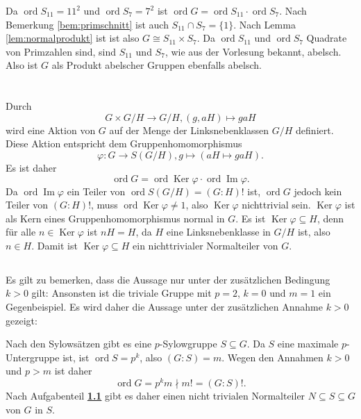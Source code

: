 \documentclass[a4paper,10pt]{article}
\theoremstyle{definition}
\newcommand{\ord}{\operatorname{ord}}
\newcommand{\Img}{\operatorname{Im}}
\newcommand{\Ker}{\operatorname{Ker}}
\begin{document}
Da $\ord S_{11} = 11^2$ und $\ord S_7 = 7^2$ ist $\ord G = \ord S_{11} \cdot \ord S_7$. Nach Bemerkung \ref{bem:primschnitt} ist auch $S_{11} \cap S_7 = \{1\}$. Nach Lemma \ref{lem:normalprodukt} ist ist also $G \cong S_{11} \times S_7$. Da $\ord S_{11}$ und $\ord S_7$ Quadrate von Primzahlen sind, sind $S_{11}$ und $S_7$, wie aus der Vorlesung bekannt, abelsch. Also ist $G$ als Produkt abelscher Gruppen ebenfalls abelsch.











\section{}


\subsection{}\label{ssec:fak}
Durch
\[
 G \times G/H \rightarrow G/H, (g,aH) \mapsto gaH
\]
wird eine Aktion von $G$ auf der Menge der Linksnebenklassen $G/H$ definiert. Diese Aktion entspricht dem Gruppenhomomorphismus
\[
 \varphi : G \rightarrow S(G/H), g \mapsto (aH \mapsto gaH).
\]
Es ist daher
\[
 \ord G
 = \ord \Ker \varphi \cdot \ord \Img \varphi.
\]
Da $\ord \Img \varphi$ ein Teiler von $\ord S(G/H) = (G:H)!$ ist, $\ord G$ jedoch kein Teiler von $(G : H)!$, muss $\ord \Ker \varphi \neq 1$, also $\Ker \varphi$ nichttrivial sein. $\Ker \varphi$ ist als Kern eines Gruppenhomomorphismus normal in $G$. Es ist $\Ker \varphi \subseteq H$, denn für alle $n \in \Ker \varphi$ ist $nH = H$, da $H$ eine Linksnebenklasse in $G/H$ ist, also $n \in H$. Damit ist $\Ker \varphi \subseteq H$ ein nichttrivialer Normalteiler von $G$.


\subsection{}
Es gilt zu bemerken, dass die Aussage nur unter der zusätzlichen Bedingung $k > 0$ gilt: Ansonsten ist die triviale Gruppe mit $p=2$, $k=0$ und $m=1$ ein Gegenbeispiel. Es wird daher die Aussage unter der zusätzlichen Annahme $k > 0$ gezeigt:

Nach den Sylowsätzen gibt es eine $p$-Sylowgruppe $S \subseteq G$. Da $S$ eine maximale $p$-Untergruppe ist, ist $\ord S = p^k$, also $(G : S) = m$. Wegen den Annahmen $k > 0$ und $p > m$ ist daher
\[
\ord G = p^k m \nmid m! = (G : S)!.
\]
Nach Aufgabenteil \textbf{\ref{ssec:fak}} gibt es daher einen nicht trivialen Normalteiler $N \subseteq S \subseteq G$ von $G$ in $S$.
\end{document}
